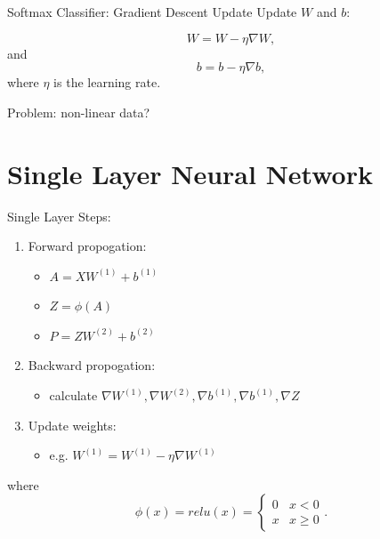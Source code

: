 \documentclass{beamer}
\begin{document}
  \begin{frame}{Softmax Classifier: Gradient Descent Update}
    Update $W$ and $b$:
    \begin{center}
      $$ W = W - \eta \nabla W, $$
      and
      $$ b = b - \eta \nabla b, $$
      where $\eta$ is the learning rate.
    \end{center}

  \end{frame}

  \begin{frame}
  Problem:
  non-linear data?
  \end{frame}

  \section{Single Layer Neural Network}
  \begin{frame}{Single Layer}
    Steps:
    \begin{enumerate}
      \item Forward propogation:
      \begin{itemize}
        \item $ A = XW^{(1)} + b^{(1)} $
        \item $ Z = \phi(A) $
        \item $ P = ZW^{(2)} + b^{(2)} $
      \end{itemize}

      \item Backward propogation:
      \begin{itemize}
        \item calculate $\nabla W^{(1)}, \nabla W^{(2)}, \nabla b^{(1)},
              \nabla b^{(1)}, \nabla Z$
      \end{itemize}

      \item Update weights:
      \begin{itemize}
        \item e.g. $W^{(1)} = W^{(1)} - \eta \nabla W^{(1)}$
      \end{itemize}
    \end{enumerate}

    where
    $$ \phi(x) = relu(x) =
      \begin{cases}
        0 & x < 0\\
        x & x \geq 0
      \end{cases}.$$
  \end{frame}
\end{document}
